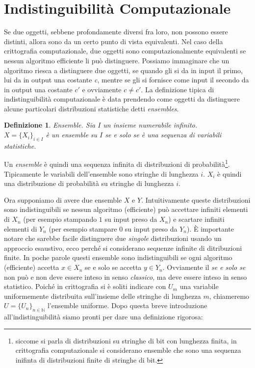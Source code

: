 \documentclass[a4paper,openright,twoside,12pt]{report}
\newtheorem{definizione}{Definizione}[chapter]
\begin{document}
\section{Indistinguibilit\`a Computazionale}
Se due oggetti, sebbene profondamente diversi fra loro, non possono essere distinti, allora sono da un certo punto di vista equivalenti.
Nel caso della crittografia computazionale, due oggetti sono computazionalmente equivalenti se nessun algoritmo efficiente li pu\`o distinguere.
Possiamo immaginare che un algoritmo riesca a distinguere due oggetti, se quando gli si da in input il primo, lui da in output una costante \emph{c}, mentre se gli si 
fornisce come input il secondo da in output una costante \emph{$c'$} e ovviamente $c \neq c'$.
La definizione tipica di indistinguibilit\`a computazionale \`e data prendendo come oggetti da distinguere alcune particolari distribuzioni statistiche detti \emph{ensembles}.

\begin{definizione}{Ensemble.}
Sia $I$ un insieme numerabile infinito.\\ $X=\{X_i\}_{i \in I}$ \`e un ensemble su $I$ se e solo se \`e una sequenza di variabili statistiche.
\end{definizione}
Un \emph{ensemble} \`e quindi una sequenza infinita di distribuzioni di probabilit\`a\footnote{siccome si parla di distribuzioni su stringhe di bit con lunghezza finita,
in crittografia computazionale si considerano ensemble che sono una sequenza inifinta di distribuzioni finite di stringhe di bit.}. 
Tipicamente le variabili dell'ensemble sono stringhe di lunghezza $i$. $X_i$ \`e quindi una distribuzione di probabilit\`a su stringhe di lunghezza $i$.

Ora supponiamo di avere due ensemble $X$ e $Y$. Intuitivamente queste distribuzioni sono indistinguibili se nessun algoritmo (efficiente) pu\`o accettare infiniti elementi di $X_n$
(per esempio stampando $1$ su input preso da $X_n$) e scartare infiniti elementi di $Y_n$ (per esempio stampare $0$ su input preso da $Y_n$). \`E importante notare che sarebbe facile 
distinguere due \emph{singole} distribuzioni usando un approccio esaustivo, ecco perch\'e si considerano sequenze infinite di ditribuzioni finite.
In poche parole questi ensemble sono indistinguibili se ogni algoritmo (efficiente) accetta $x \in X_n$ se e solo se accetta $y \in Y_n$. Ovviamente il \emph{se e solo se} non pu\`o e non deve
essere inteso in senso \emph{classico}, ma deve essere inteso in senso statistico. Poich\'e in crittografia si \`e soliti indicare con $U_m$ una variabile
uniformemente distribuita sull'insieme delle stringhe di lunghezza $m$, chiameremo $U=\{U_n\}_{n \in \mathbb{N}}$ l'ensemble uniforme.
Dopo questa breve introduzione all'indistinguibilit\`a siamo pronti per dare una definizione rigorosa:
\end{document}
